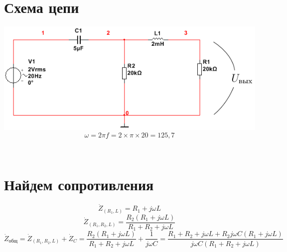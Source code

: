 \documentclass[12pt, a4paper]{report}
\begin{document}
    \section{\textbf{Схема цепи}}
    \begin{center}
        \includegraphics[scale = 3]{photo1.png}\\
        \bigskip\bigskip
        \[ \omega = 2\pi f = 2 \times \pi \times 20 = 125,7 \]
    \end{center}\\
    \section{Найдем сопротивления}
    \[ \dot{Z}_{(R_1,L)} = R_1 + j\omega L \]
    \[ \dot{Z}_{(R_1,R_2,L)} = \frac{R_2(R_1 + j\omega L)}{R_1 + R_2 + j\omega L} \]
    \[ \dot{Z}_{\text{общ}} = \dot{Z}_{(R_1,R_2,L)} + \dot{Z}_{C} = \frac{R_2(R_1 + j\omega L)}{R_1 + R_2 + j\omega L} + \frac{1}{j\omega C} = \frac{R_1 + R_2 + j\omega L + R_{2}j\omega C(R_1 + j\omega L)}{j\omega C(R_1 + R_2 + j\omega L)} \]

    \newpage
\end{document}
